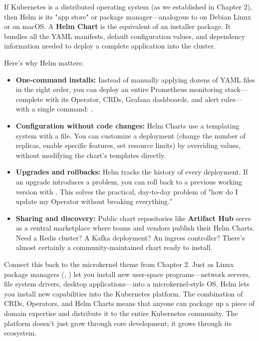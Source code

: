 If Kubernetes is a distributed operating system (as we established in Chapter 2), then Helm is its "app store" or package manager---analogous to  on Debian Linux or  on macOS. A \textbf{Helm Chart} is the equivalent of an installer package. It bundles all the YAML manifests, default configuration values, and dependency information needed to deploy a complete application into the cluster.

Here's why Helm matters:

\begin{itemize}
\item \textbf{One-command installs:} Instead of manually applying dozens of YAML files in the right order, you can deploy an entire Prometheus monitoring stack---complete with its Operator, CRDs, Grafana dashboards, and alert rules---with a single command: .
\item \textbf{Configuration without code changes:} Helm Charts use a templating system with a  file. You can customize a deployment (change the number of replicas, enable specific features, set resource limits) by overriding values, without modifying the chart's templates directly.
\item \textbf{Upgrades and rollbacks:} Helm tracks the history of every deployment. If an upgrade introduces a problem, you can roll back to a previous working version with . This solves the practical, day-to-day problem of "how do I update my Operator without breaking everything."
\item \textbf{Sharing and discovery:} Public chart repositories like \textbf{Artifact Hub} serve as a central marketplace where teams and vendors publish their Helm Charts. Need a Redis cluster? A Kafka deployment? An ingress controller? There's almost certainly a community-maintained chart ready to install.
\end{itemize}

Connect this back to the microkernel theme from Chapter 2. Just as Linux package managers (, ) let you install new user-space programs---network servers, file system drivers, desktop applications---into a microkernel-style OS, Helm lets you install new capabilities into the Kubernetes platform. The combination of CRDs, Operators, and Helm Charts means that anyone can package up a piece of domain expertise and distribute it to the entire Kubernetes community. The platform doesn't just grow through core development; it grows through its ecosystem.


